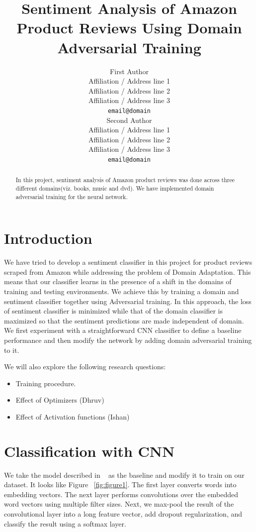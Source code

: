 \documentclass[11pt,a4paper]{article}
\title{Sentiment Analysis of Amazon Product Reviews Using Domain Adversarial Training}
\author{First Author \\
  Affiliation / Address line 1 \\
  Affiliation / Address line 2 \\
  Affiliation / Address line 3 \\
  {\tt email@domain} \\\And
  Second Author \\
  Affiliation / Address line 1 \\
  Affiliation / Address line 2 \\
  Affiliation / Address line 3 \\
  {\tt email@domain} \\}
\date{}
\begin{document}
\maketitle
\begin{abstract}
  In this project, sentiment analysis of Amazon product reviews was done across three different domains(viz. books, music and dvd). We have implemented domain adversarial training for the neural network.
\end{abstract}

\section{Introduction}

We have tried to develop a sentiment classifier in this project for product reviews scraped from Amazon while addressing the problem of Domain Adaptation. This means that our classifier learns in the presence of a shift in the domains of training and testing environments. We achieve this by training a domain and sentiment classifier together using Adversarial training. In this approach, the loss of sentiment classifier is minimized while that of the domain classifier is maximized so that the sentiment predictions are made independent of domain. We first experiment with a straightforward CNN classifier to define a baseline performance and then modify the network by adding domain adversarial training to it.

We will also explore the following research questions:
\begin{itemize}
  \item Training procedure.
  \item Effect of Optimizers (Dhruv)
  \item Effect of Activation functions (Ishan)
\end{itemize}

\section{Classification with CNN}

We take the model described in ~\cite{Britz} as the baseline and modify it to train on our dataset. It looks like Figure ~\ref{fig:figure1}. The first layer converts words into embedding vectors. The next layer performs convolutions over the embedded word vectors using multiple filter sizes. Next, we max-pool the result of the convolutional layer into a long feature vector, add dropout regularization, and classify the result using a softmax layer.
\end{document}
